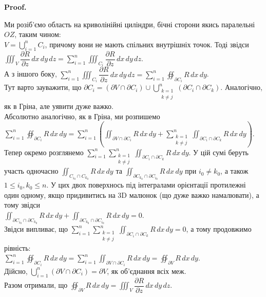 \documentclass[a4paper, 10pt]{article}
\makeatletter
\def\departial#1#2{\dfrac{\partial {#1}}{\partial {#2}}}
\def\qed{$\blacksquare$}
\theoremstyle{theoremdd}
\theoremstyle{theoremdd}
\theoremstyle{theoremdd}
\theoremstyle{theoremdd}
\theoremstyle{theoremdd}
\theoremstyle{theoremdd}
\theoremstyle{theoremdd}
\theoremstyle{theoremdd}
\renewenvironment{proof}[1][Proof.\\]{\par
\pushQED{\hfill \qed}%
\normalfont \topsep6\p@\@plus6\p@\relax
\trivlist
\item\relax
{\bfseries
#1\@addpunct{.}}\hspace\labelsep\ignorespaces
}{%
\popQED\endtrivlist\@endpefalse
}
\makeatother
\begin{document}
\begin{proof}
Ми розіб'ємо область на криволінійні циліндри, бічні сторони якись паралельні $OZ$, таким чином:\\
$V = \displaystyle\bigcup_{i=1}^n C_i$, причому вони не мають спільних внутрішніх точок. Тоді звідси\\
$\displaystyle\iiint_V \departial{R}{z}\,dx\,dy\,dz = \sum_{i=1}^n \iiint_{C_i} \departial{R}{z}\,dx\,dy\,dz$.\\
А з іншого боку, $\displaystyle\sum_{i=1}^n \iiint_{C_i} \departial{R}{z}\,dx\,dy\,dz = \sum_{i=1}^n\oiint_{\partial C_i} R\,dx\,dy$.\\
Тут варто зауважити, що $\partial C_i = (\partial V \cap \partial C_i) \cup \displaystyle\bigcup_{\substack{k = 1 \\ k \neq j}}^n (\partial C_i \cap \partial C_k)$. Аналогічно, як в Гріна, але уявити дуже важко.\\
Абсолютно аналогічно, як в Гріна, ми розпишемо\\
$\displaystyle\sum_{i=1}^n\oiint_{\partial C_i} R\,dx\,dy = \sum_{i=1}^n \left( \iint_{\partial V \cap \partial C_i}R\,dx\,dy + \sum_{\substack{k = 1 \\ k \neq j}}^n \iint_{\partial C_i \cap \partial C_k}R\,dx\,dy \right)$.\\
Тепер окремо розглянемо $\displaystyle\sum_{i=1}^n \sum_{\substack{k=1 \\ k \neq j}}^n \iint_{\partial C_i \cap \partial C_k} R\,dx\,dy$. У цій сумі беруть участь одночасно $\displaystyle\iint_{C_{i_0} \cap C_{k_0}} R\,dx\,dy$ та $\displaystyle\iint_{\partial C_{k_0} \cap \partial C_{i_0}} R\,dx\,dy$ при $i_0 \neq k_0$, а також $1 \leq i_0,k_0 \leq n$. У цих двох поверхнось під інтегралами орієнтації протилежні один одному, якщо придивитись на 3D малюнок (що дуже важко намалювати), а тому звідси\\
$\displaystyle\iint_{\partial C_{i_0} \cap \partial C_{k_0}} R\,dx\,dy + \iint_{\partial C_{k_0} \cap \partial C_{i_0}} R\,dx\,dy = 0$.\\
Звідси випливає, що $\displaystyle\sum_{i=1}^n \sum_{\substack{k=1 \\ k \neq j}}^n \iint_{\partial C_i \cap \partial C_k} R\,dx\,dy = 0$, а тому продовжимо рівність:\\
$\displaystyle\sum_{i=1}^n \oiint_{\partial C_i} R\,dx\,dy = \sum_{i=1}^n \iint_{\partial V \cap \partial C_i} R\,dx\,dy = \oiint_{\partial V} R\,dx\,dy$.\\
Дійсно, $\displaystyle\bigcup_{i=1}^n (\partial V \cap \partial C_i) = \partial V$, як об'єднання всіх меж.\\
Разом отримали, що $\displaystyle\oiint_{\partial V}R\,dx\,dy = \iiint_V \departial{R}{z}\,dx\,dy\,dz$.
\end{proof}
\end{document}
